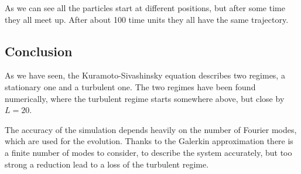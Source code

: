 As we can see all the particles start at different positions, but after some time they all meet up. After about 100 time units they all have the same trajectory.

\subsection{Conclusion}
As we have seen, the Kuramoto-Sivashinsky equation describes two regimes, a stationary one and a turbulent one. The two regimes have been found numerically, where the turbulent regime starts somewhere above, but close by $L = 20$.

The accuracy of the simulation depends heavily on the number of Fourier modes, which are used for the evolution. Thanks to the Galerkin approximation there is a finite number of modes to consider, to describe the system accurately, but too strong a reduction lead to a loss of the turbulent regime.
